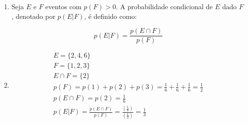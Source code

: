 \item
\begin{enumerate}
  \item
  Seja $E$ e $F$ eventos com $p(F) > 0$. A probabilidade condicional de $E$ dado
  $F$, denotado por $p(E | F)$, é definido como:

  \[p(E|F) = \frac{{p(E \cap F)}}{{p(F)}}\]

  \item

  \[\begin{array}{l}
  E = \{ 2,4,6\} \\
  F = \{ 1,2,3\} \\
  E \cap F = \{ 2\} \\
  p(F) = p(1) + p(2) + p(3) = \frac{1}{6} + \frac{1}{6} + \frac{1}{6} = \frac{1}{2}\\
  p(E \cap F) = p(2) = \frac{1}{6}\\
  p(E|F) = \frac{{p(E \cap F)}}{{p(F)}} = \frac{{\left( {\frac{1}{6}} \right)}}{{\left( {\frac{1}{2}} \right)}} = \frac{1}{3}
  \end{array}\]
\end{enumerate}
